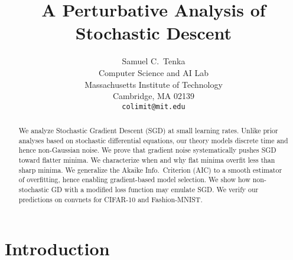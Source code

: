 \documentclass{article}
\title{%
    A Perturbative Analysis of Stochastic Descent
}
\author{%
    Samuel C.~Tenka \\
    Computer Science and AI Lab \\
    Massachusetts Institute of Technology \\
    Cambridge, MA 02139 \\
    \texttt{colimit@mit.edu}
}
\theoremstyle{plain}
\theoremstyle{definition}
\begin{document}
    \maketitle
    
    
    \begin{abstract}
        We analyze Stochastic Gradient Descent (SGD) at small learning rates.
        Unlike prior analyses based on stochastic differential equations, our
        theory models discrete time and hence non-Gaussian noise.
        We prove that gradient noise systematically pushes SGD toward flatter
        minima.  We characterize when and why flat minima overfit less than
        sharp minima.  We generalize the Akaike Info.\ Criterion (AIC) to a
        smooth estimator of overfitting, hence enabling gradient-based model
        selection.  We show how non-stochastic GD with a modified loss function
        may emulate SGD.
        We verify our predictions on convnets for CIFAR-10 and Fashion-MNIST.
    \end{abstract}
    

\section{Introduction}


\end{document}
